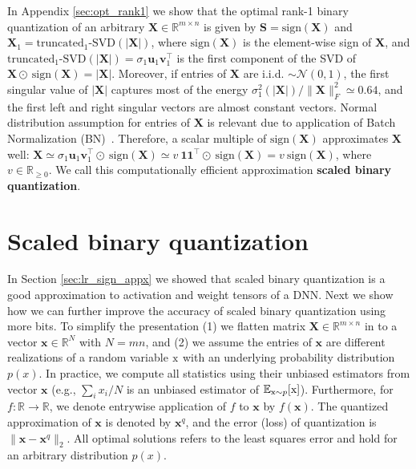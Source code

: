 \documentclass[10pt,twocolumn,letterpaper]{article}
\def\evx{{x}}
\def\rx{{\textnormal{x}}}
\def\vu{{\bm{u}}}
\def\vv{{\bm{v}}}
\def\vx{{\bm{x}}}
\def\mX{{\bm{X}}}
\def\mS{{\bm{S}}}
\newcommand{\R}{\mathbb{R}}
\newcommand{\E}{\mathbb{E}}
\begin{document}
In Appendix \ref{sec:opt_rank1} we show that the optimal rank-1 binary quantization of an arbitrary $\mX \in \R^{m \times n}$ is given by $\mS = \text{sign}(\mX)$ and $\mX_1 = \text{truncated}_1\text{-SVD}(|\mX|)$, where $\text{sign}(\mX)$ is the element-wise sign of $\mX$, and $\text{truncated}_1\text{-SVD}(|\mX|) = \sigma_1 \vu_1 \vv_1^{\top}$ is the first component of the SVD of $\mX \odot ~\! \text{sign}(\mX) = | \mX |$.
Moreover, if entries of $\mX$ are i.i.d. $\sim \mathcal{N}(0,1)$, the first singular value of $| \mX |$ captures most of the energy $\sigma_1^2(|\mX|) / \| \mX\|_F^2 \simeq 0.64$, and the first left and right singular vectors are almost constant vectors. Normal distribution assumption for entries of $\mX$ is relevant due to application of Batch Normalization (BN)~\cite{ioffe2015batch}.
Therefore, a scalar multiple of $\text{sign}(\mX)$ approximates $\mX$ well: $\mX \simeq  \sigma_1 \vu_1 \vv_1^{\top} \odot~\! \text{sign}(\mX) \simeq v~\boldsymbol{1} \boldsymbol{1}^{\top} \odot ~\!\text{sign}(\mX) = v~\!\text{sign}(\mX)$, where $v \in \R_{\ge 0}$.
We call this computationally efficient approximation {\bf scaled binary quantization}.

\section{Scaled binary quantization} \label{sec:scalar_sign_appx}
In Section \ref{sec:lr_sign_appx} we showed that scaled binary quantization is a good approximation to activation and weight tensors of a DNN.
Next we show how we can further improve the accuracy of scaled binary quantization using more bits.
To simplify the presentation (1) we flatten matrix $\mX \in \R^{m\times n}$ in to a vector $\vx \in \R^N$ with $N=mn$, and
(2) we assume the entries of $\vx$ are different realizations of a random variable $\rx$ with an underlying probability distribution $p(x)$. 
In practice, we compute all statistics using their unbiased estimators from vector $\vx$ (e.g., $\sum_{i} \evx_i / N$ is an unbiased estimator of $\E_{\rx\sim p} [ \rx ]$).
Furthermore, for $f: \R \to \R$, we denote entrywise application of $f$ to $\vx$ by $f(\vx)$.
The quantized approximation of $\vx$ is denoted by $\vx^q$, and the error (loss) of quantization is $\|\vx - \vx^q\|_2$. All optimal solutions refers to the least squares error and hold for an arbitrary distribution $p(x)$.
\end{document}
